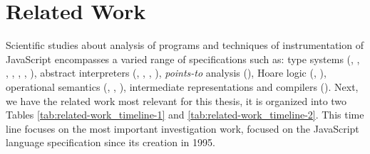 \documentclass[runningheads]{llncs}
\begin{document}
\section{Related Work}
\label{sec:Related Work}

Scientific studies about analysis of programs and techniques of instrumentation of JavaScript encompasses a varied range of specifications such as: type systems (\cite{Type_Analysis_for_JavaScript}, \cite{Towards_Type_Inference_for_JavaScript}, \cite{Understanding_TypeScript},  \cite{Fast_and_precise_hybrid_type_inference_for_JavaScript}, \cite{Depedent_Types_for_JavaScript}, \cite{Safe_&_Efficient_Gradual_Typing_for_TypeScript},  \cite{Type_Inference_for_Static_Compilation_of_JavaScript}), abstract interpreters (\cite{SAFE:Formal_Specification_and_Implementation_of_a_Scalable_Analysis_Framework_for_ECMAScript}, \cite{JSAI:a_static_analysis_platform_for_JavaScript}, \cite{Scalable_and_Precise_Static_Analysis_of_JavaScript_Applications_via_Loop-Sensitivity},  \cite{Combining_string_abstract_domains_for_JavaScript_analysis:an_evaluation)}), \emph{points-to} analysis (\cite{Points-to_analysis_for_JavaScript}), Hoare logic (\cite{Javert-2017}, \cite{Javert-2019}), operational semantics (\cite{JSCert-2014}, \cite{KJS-2015}, \cite{JSExplain-2018}), intermediate representations and compilers (\cite{Dynamic_property_caches:a_step_towards_faster_JavaScript_proxy_objects}). Next, we have the related work  most relevant for this thesis, it is organized into two Tables \ref{tab:related-work_timeline-1} and \ref{tab:related-work_timeline-2}. This time line focuses on the most important investigation work, focused on the JavaScript language specification since its creation in 1995.
\end{document}
